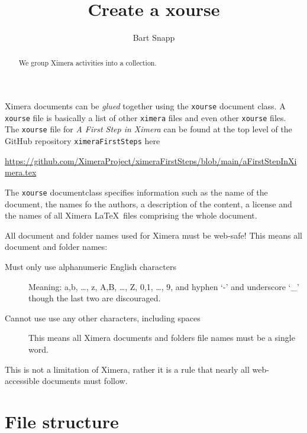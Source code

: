 \documentclass{ximera}
\title{Create a xourse}
\author{Bart Snapp}
\begin{document}
\begin{abstract}
  We group Ximera activities into a collection.
\end{abstract}
\maketitle


Ximera documents can be \textit{glued} together using the \texttt{xourse}
document class. A \verb|xourse| file is basically a list of other \verb|ximera| files and even
other \verb|xourse| files. The \verb|xourse| file for \textit{A First Step in Ximera} can be found at the top level of the GitHub repository
\verb!ximeraFirstSteps! here
\begin{center}
  \url{https://github.com/XimeraProject/ximeraFirstSteps/blob/main/aFirstStepInXimera.tex}
\end{center}
The \verb!xourse! documentclass specifies information such as the name of the
document, the names fo the authors, a description of the content, a license and
the names of all Ximera \LaTeX\ files comprising
the whole document.

\begin{warning}
  All document and folder names used for Ximera must be web-safe! This means
  all document and folder names:
  \begin{description}
    \item[Must only use alphanumeric English characters] Meaning: a,b, \dots,
      z, A,B, \dots, Z, 0,1, \dots, 9, and hyphen `-' and underscore `\_'
      though the
      last two are discouraged.
    \item[Cannot use use any other characters, including spaces] This means all
      Ximera documents and folders file names must be a single word.
  \end{description}
  This is not a limitation of Ximera, rather it is a rule that nearly all
  web-accessible documents must follow.
\end{warning}

\section{File structure}
\end{document}
